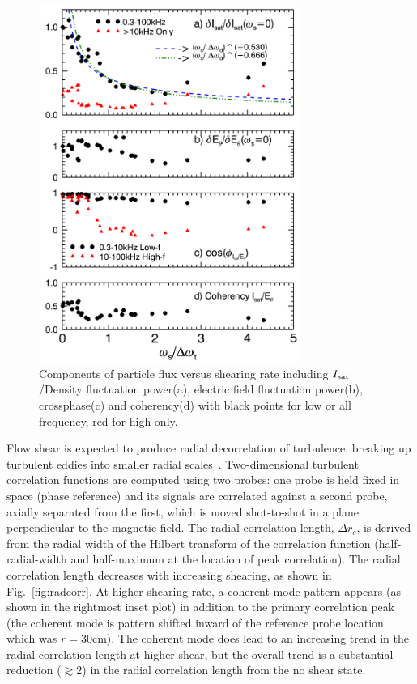 \documentclass[aps,prl,amsmath,amssymb,preprint,superscriptaddress]{revtex4}
\begin{document}
\begin{figure}[!htbp]
\centerline{
\includegraphics[width=8.5cm]{fluxcomps.pdf}}
\caption{\label{fig:fluxcomps} Components of particle flux versus shearing rate including $I_{\rm sat}$/Density fluctuation power(a), electric field fluctuation power(b), crossphase(c) and coherency(d) with black points for low or all frequency, red for high only.}
\end{figure}

Flow shear is expected to produce radial decorrelation of turbulence,
breaking up turbulent eddies into smaller radial scales~\cite{biglari90}.
Two-dimensional turbulent correlation functions are computed using
two probes: one probe is held fixed in space (phase reference) and
its signals are correlated against a second probe, axially separated
from the first, which is moved shot-to-shot in a plane perpendicular
to the magnetic field.  The radial correlation length, $\Delta r_c$,
is derived from the radial width of the Hilbert transform of the
correlation function (half-radial-width and half-maximum at the
location of peak correlation).  The radial correlation length 
decreases with increasing shearing, as shown in
Fig.~\ref{fig:radcorr}.  At higher shearing rate, a coherent mode
pattern appears (as shown in the rightmost inset plot) in addition to
the primary correlation peak (the coherent mode is
pattern shifted inward of the reference probe location which was $r=30$cm).  The coherent
mode does lead to an increasing trend in the radial correlation length
at higher shear, but the overall trend is a substantial reduction
($\gtrsim 2$) in the radial correlation length from the no shear state.
\end{document}
